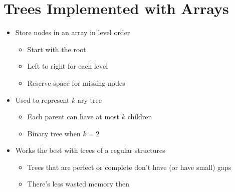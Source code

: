 \documentclass[10pt]{article}
\begin{document}
\section*{Trees Implemented with Arrays}
\begin{itemize}
    \item Store nodes in an array in level order
    \begin{itemize}
        \item Start with the root
        \item Left to right for each level
        \item Reserve space for missing nodes
    \end{itemize}
    \item Used to represent $k$-ary tree
    \begin{itemize}
        \item Each parent can have at most $k$ children
        \item Binary tree when $k=2$
    \end{itemize}
    \item Works the best with trees of a regular structures
    \begin{itemize}
        \item Trees that are perfect or complete don't have (or have small) gaps
        \item There's less wasted memory then
    \end{itemize}
\end{itemize}
\end{document}

